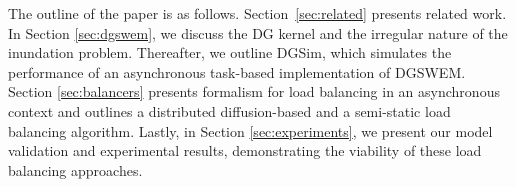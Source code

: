 The outline of the paper is as follows. Section~\ref{sec:related} presents related work.  In Section \ref{sec:dgswem}, we discuss the DG kernel and the irregular nature of the inundation problem. Thereafter, we outline DGSim, which simulates the performance of an asynchronous task-based implementation of DGSWEM. Section \ref{sec:balancers} presents formalism for load balancing in an asynchronous context and outlines a distributed diffusion-based and a semi-static load balancing algorithm. Lastly, in Section \ref{sec:experiments}, we present our model validation and experimental results, demonstrating the viability of these load balancing approaches.
